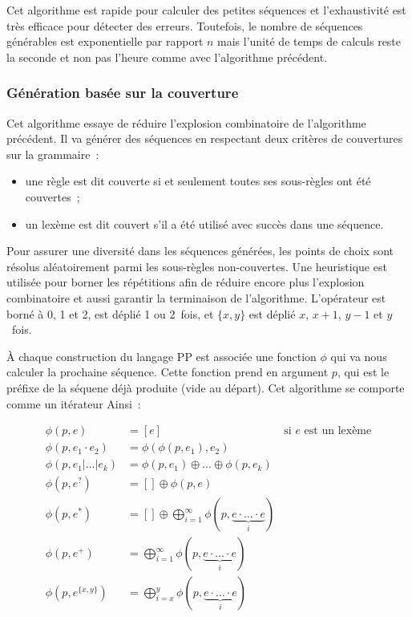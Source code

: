 Cet algorithme est rapide pour calculer des petites séquences et l'exhaustivité
est très efficace pour détecter des erreurs. Toutefois, le nombre de séquences
générables est exponentielle par rapport $n$ mais l'unité de temps de calculs
reste la seconde et non pas l'heure comme avec l'algorithme précédent.

\subsubsection{Génération basée sur la couverture}
\label{subsection:data:coverage_based_generation}

Cet algorithme essaye de réduire l'explosion combinatoire de l'algorithme
précédent. Il va générer des séquences en respectant deux critères de
couvertures sur la grammaire~:
%
\begin{itemize}

\item une règle est dit couverte si et seulement toutes ses sous-règles ont été
couvertes~;

\item un lexème est dit couvert s'il a été utilisé avec succès dans une
séquence.

\end{itemize}
%
Pour assurer une diversité dans les séquences générées, les points de choix sont
résolus aléatoirement parmi les sous-règles non-couvertes. Une heuristique est
utilisée pour borner les répétitions afin de réduire encore plus l'explosion
combinatoire et aussi garantir la terminaison de l'algorithme. L'opérateur
\code{*} est borné à 0, 1 et 2, \code{+} est déplié 1 ou 2~fois, et $\{x, y\}$
est déplié $x$, $x + 1$, $y - 1$ et $y$~fois.

À chaque construction du langage PP est associée une fonction $\phi$ qui va nous
calculer la prochaine séquence. Cette fonction prend en argument $p$, qui est le
préfixe de la séquene déjà produite (vide au départ). Cet algorithme se comporte
comme un itérateur Ainsi~:

\begin{align*}
%
\phi(p, e) & =
    [e]
    &
    \text{si $e$ est un lexème}
    \\
%
\phi(p, e_1 \cdot e_2) & =
    \phi(\phi(p, e_1), e_2)
    \\
%
\phi(p, e_1 \vert \dotso \vert e_k) & =
    \phi(p, e_1) \oplus \dotso \oplus \phi(p, e_k)
    \\
%
\phi(p, e^?) & =
    [] \oplus \phi(p, e)
    \\
%
\phi(p, e^*) & =
    [] \oplus \bigoplus_{i = 1}^\infty
    \phi(p, \underbrace{e \cdot \dotso \cdot e}_i)
    \\
%
\phi(p, e^+) & =
    \bigoplus_{i = 1}^\infty \phi(p, \underbrace{e \cdot \dotso \cdot e}_i)
    \\
%
\phi(p, e^{\{x, y\}}) & =
    \bigoplus_{i = x}^y \phi(p, \underbrace{e \cdot \dotso \cdot e}_i)
%
\end{align*}

